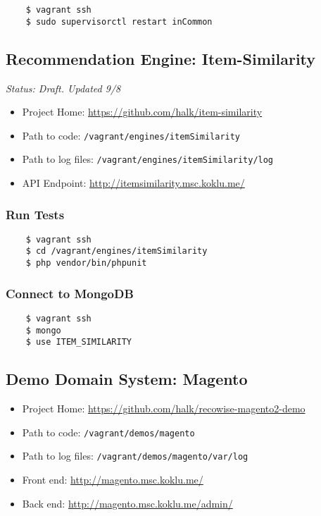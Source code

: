 \begin{verbatim}
    $ vagrant ssh
    $ sudo supervisorctl restart inCommon
\end{verbatim}


\subsection{Recommendation Engine: Item-Similarity}

\emph{Status: Draft. Updated 9/8}

\begin{itemize}
\item Project Home: \url{https://github.com/halk/item-similarity}
\item Path to code: \texttt{/vagrant/engines/itemSimilarity}
\item Path to log files: \texttt{/vagrant/engines/itemSimilarity/log}
\item API Endpoint: \url{http://itemsimilarity.msc.koklu.me/}
\end{itemize}

\subsubsection{Run Tests}

\begin{verbatim}
    $ vagrant ssh
    $ cd /vagrant/engines/itemSimilarity
    $ php vendor/bin/phpunit
\end{verbatim}

\subsubsection{Connect to MongoDB}

\begin{verbatim}
    $ vagrant ssh
    $ mongo
    $ use ITEM_SIMILARITY
\end{verbatim}



\subsection{Demo Domain System: Magento}

\begin{itemize}
\item Project Home: \url{https://github.com/halk/recowise-magento2-demo}
\item Path to code: \texttt{/vagrant/demos/magento}
\item Path to log files: \texttt{/vagrant/demos/magento/var/log}
\item Front end: \url{http://magento.msc.koklu.me/}
\item Back end: \url{http://magento.msc.koklu.me/admin/}
\end{itemize}

